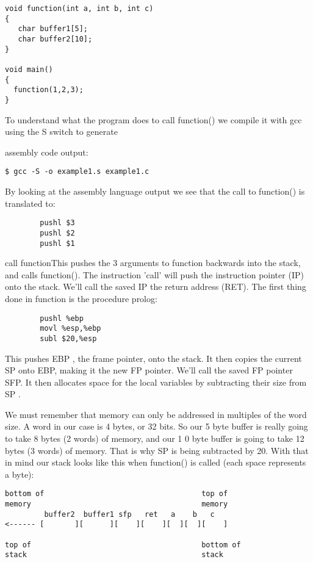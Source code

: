\documentclass[12pt]{article}
\begin{document}
\begin{lstlisting}[caption=example1.c]
void function(int a, int b, int c) 
{
   char buffer1[5];
   char buffer2[10];
}

void main() 
{
  function(1,2,3);
}
\end{lstlisting}

To understand what the program does to call function() we compile it with gcc using the  S switch to generate 

assembly code output: 

\begin{verbatim}
$ gcc -S -o example1.s example1.c
\end{verbatim}

By looking at the assembly language output we see that the call to function() is translated to:

\begin{lstlisting}
        pushl $3
        pushl $2
        pushl $1
\end{lstlisting}
call functionThis pushes the 3 arguments to function backwards into the stack, and calls function().
The instruction 'call' will push the instruction pointer (IP) onto the stack.
We'll call the saved IP the return address (RET).  The first thing done in function is the procedure prolog:

\begin{lstlisting}
        pushl %ebp
        movl %esp,%ebp
        subl $20,%esp
\end{lstlisting}

This pushes EBP , the frame pointer, onto the stack.  It then copies the current SP onto EBP, making it the new 
FP pointer.  We'll call the saved FP pointer SFP.  It then allocates space for the local variables by subtracting 
their size from SP .

We must remember that memory can only be addressed in multiples of the word size.   A word in our case is 4 
bytes, or 32 bits.  So our 5 byte buffer is really going to take 8 bytes (2 words) of memory, and our 1 0 byte 
buffer is going to take 12 bytes (3 words) of memory.  That is why SP is being subtracted by 20.  With that in 
mind our stack looks like this when function() is called  (each space represents a byte):

{\small
\begin{verbatim}
bottom of                                    top of
memory                                       memory
         buffer2  buffer1 sfp   ret   a    b   c
<------ [       ][      ][    ][    ][  ][  ][    ]

top of                                       bottom of
stack                                        stack
\end{verbatim}
}
\end{document}
